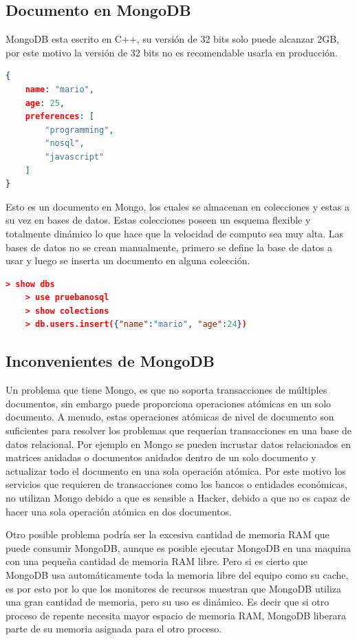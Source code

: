 \subsection{Documento en MongoDB}
MongoDB esta escrito en C++, su versión de 32 bits solo puede alcanzar 2GB, por este motivo la versión de 32 bits no es recomendable usarla en producción.
\begin{lstlisting}[language=JSON] 
{
    name: "mario",
    age: 25,
    preferences: [
        "programming",
        "nosql",
        "javascript"
    ]
}

\end{lstlisting}


Esto es un documento en Mongo, los cuales se almacenan en colecciones y estas a su vez en bases de datos. Estas colecciones poseen un esquema flexible y totalmente dinámico lo que hace que la velocidad de computo sea muy alta. Las bases de datos no se crean manualmente, primero se define la base de datos a usar y luego se inserta un documento en alguna colección.

\begin{lstlisting}[language=JSON] 
    > show dbs
    > use pruebanosql
    > show colections
    > db.users.insert({"name":"mario", "age":24})
\end{lstlisting}

\subsection{Inconvenientes de MongoDB}
Un problema que tiene Mongo, es que no soporta transacciones de múltiples documentos, sin embargo puede proporciona operaciones atómicas en un solo documento. A menudo, estas operaciones atómicas de nivel de documento son suficientes para resolver los problemas que requerían transacciones en una base de datos relacional. Por ejemplo en Mongo se pueden incrustar datos relacionados en matrices anidadas o documentos anidados dentro de un solo documento y actualizar todo el documento en una sola operación atómica. Por este motivo los servicios que requieren de transacciones como los bancos o entidades económicas, no utilizan Mongo debido a que es sensible a Hacker, debido a que no es capaz de hacer una sola operación atómica en dos documentos.

Otro posible problema podría ser la excesiva cantidad de memoria RAM que puede consumir MongoDB, aunque es posible ejecutar MongoDB en una maquina con una pequeña cantidad de memoria RAM libre. Pero si es cierto que MongoDB usa automáticamente toda la memoria libre del equipo como su cache, es por esto por lo que los monitores de recursos muestran que MongoDB utiliza una gran cantidad de memoria, pero su uso es dinámico. Es decir que si otro proceso de repente necesita mayor espacio de memoria RAM, MongoDB liberara parte de su memoria asignada para el otro proceso.

